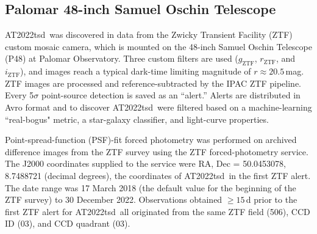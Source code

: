 \documentclass{nature_plusfigure}
\newcommand{\at}{AT2022tsd}
\begin{document}
\begin{methods}
\subsection{Palomar 48-inch Samuel Oschin Telescope}
\label{sec:p48}

\at\ was discovered in data from the Zwicky Transient Facility (ZTF\cite{Graham2019,Bellm2019}) custom mosaic camera\cite{Dekany2020}, which is mounted on the 48-inch Samuel Oschin Telescope (P48) at Palomar Observatory.
Three custom filters are used ($g_{\mathrm{ZTF}}$, $r_{\mathrm{ZTF}}$, and $i_{\mathrm{ZTF}}$\cite{Dekany2020}),
and images reach a typical dark-time limiting magnitude of $r\approx20.5\,$mag.
ZTF images are processed and reference-subtracted\cite{Zackay2016}
by the IPAC ZTF pipeline\cite{Masci2019}.
Every 5$\sigma$ point-source detection is saved as an ``alert.''
Alerts are distributed in Avro format\cite{Patterson2019} and to discover \at\ were filtered based on a machine-learning ``real-bogus" metric\cite{Duev2019}, a star-galaxy classifier\cite{Tachibana2018}, and light-curve properties.

Point-spread-function (PSF)-fit forced photometry was performed on archived difference images from the ZTF survey using the ZTF forced-photometry service\cite{Masci2019}. The J2000 coordinates supplied to the service were RA, Dec = 50.0453078, 8.7488721 (decimal degrees), the coordinates of \at\ in the first ZTF alert. The date range was 17 March 2018 (the default value for the beginning of the ZTF survey) to 30 December 2022.
Observations obtained $\geq 15$\,d prior to the first ZTF alert for \at\ all originated from the same ZTF field (506), CCD ID (03), and CCD quadrant (03). 


\end{methods}
\end{document}
